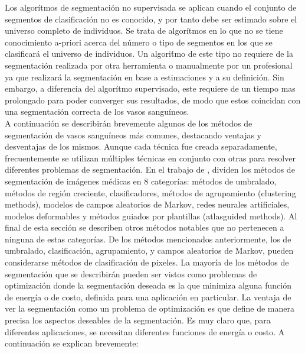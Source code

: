 Los algor\'itmos de segmentaci\'on no supervisada se aplican cuando el conjunto de segmentos de clasificaci\'on no es conocido, y por tanto debe ser estimado sobre el universo completo de individuos. Se trata de algor\'itmos en lo que no se tiene conocimiento a-priori acerca del n\'umero o tipo de segmentos en los que se clasificar\'a el universo de individuos. Un algori\'tmo de este tipo no requiere de la segmentaci\'on realizada por otra herramienta o manualmente por un profesional ya que realizar\'a  la segmentaci\'on en base a estimaciones y a su definici\'on. Sin embargo, a diferencia del algor\'itmo supervisado, este requiere de un tiempo mas prolongado para poder converger sus resultados, de modo que estos coincidan con una segmentaci\'on correcta de los vasos sangu\'ineos.\\


A continuaci\'on se describir\'an brevemente algunos de los m\'etodos de segmentaci\'on de vasos sangu\'ineos m\'as comunes, destacando ventajas y desventajas de los mismos.
Aunque cada t\'ecnica fue creada separadamente, frecuentemente se utilizan m\'ultiples t\'ecnicas en conjunto con otras
para resolver diferentes problemas de segmentaci\'on.
En el trabajo de \cite{pham2000current}, dividen los m\'etodos de segmentaci\'on de im\'agenes m\'edicas en 8 categor\'ias: m\'etodos de umbralado, m\'etodos de regi\'on creciente, clasificadores, m\'etodos de agrupamiento (clustering methods), modelos de campos aleatorios de Markov, redes neurales artificiales, modelos deformables y m\'etodos guiados por plantillas (atlasguided methods). Al final de esta secci\'on se describen otros m\'etodos notables que no pertenecen a ninguna de estas categor\'ias. De los m\'etodos mencionados anteriormente, los de umbralado, clasificaci\'on, agrupamiento, y campos aleatorios de Markov, pueden considerarse m\'etodos de clasificaci\'on de pixeles.
La mayor\'ia de los m\'etodos de segmentaci\'on que se describir\'an pueden ser vistos como problemas de optimizaci\'on donde la segmentaci\'on deseada es la que minimiza alguna funci\'on de energ\'ia o de costo, definida para una aplicaci\'on en particular. La ventaja de ver la segmentaci\'on como un problema de optimizaci\'on es que define de manera precisa los aspectos deseables de la segmentaci\'on. Es muy claro que, para diferentes aplicaciones, se necesitan diferentes funciones de energ\'ia o costo. A continuaci\'on se explican brevemente:

